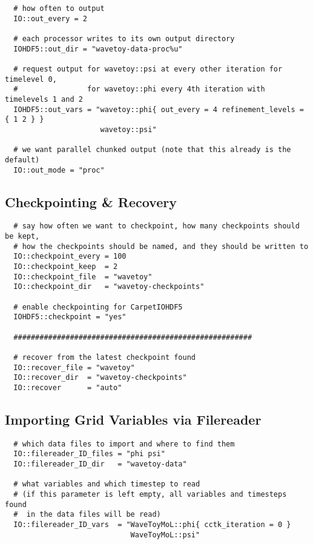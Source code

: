 \documentclass{article}
\begin{document}
\begin{verbatim}
  # how often to output
  IO::out_every = 2

  # each processor writes to its own output directory
  IOHDF5::out_dir = "wavetoy-data-proc%u"

  # request output for wavetoy::psi at every other iteration for timelevel 0,
  #                for wavetoy::phi every 4th iteration with timelevels 1 and 2
  IOHDF5::out_vars = "wavetoy::phi{ out_every = 4 refinement_levels = { 1 2 } }
                      wavetoy::psi"

  # we want parallel chunked output (note that this already is the default)
  IO::out_mode = "proc"
\end{verbatim}

\subsection{Checkpointing \& Recovery}

\begin{verbatim}
  # say how often we want to checkpoint, how many checkpoints should be kept,
  # how the checkpoints should be named, and they should be written to
  IO::checkpoint_every = 100
  IO::checkpoint_keep  = 2
  IO::checkpoint_file  = "wavetoy"
  IO::checkpoint_dir   = "wavetoy-checkpoints"

  # enable checkpointing for CarpetIOHDF5
  IOHDF5::checkpoint = "yes"

  #######################################################

  # recover from the latest checkpoint found
  IO::recover_file = "wavetoy"
  IO::recover_dir  = "wavetoy-checkpoints"
  IO::recover      = "auto"
\end{verbatim}

\subsection{Importing Grid Variables via Filereader}

\begin{verbatim}
  # which data files to import and where to find them
  IO::filereader_ID_files = "phi psi"
  IO::filereader_ID_dir   = "wavetoy-data"

  # what variables and which timestep to read
  # (if this parameter is left empty, all variables and timesteps found
  #  in the data files will be read)
  IO::filereader_ID_vars  = "WaveToyMoL::phi{ cctk_iteration = 0 }
                             WaveToyMoL::psi"
\end{verbatim}
\end{document}
